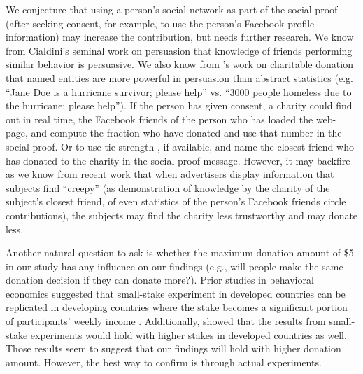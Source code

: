 \begin{description} [leftmargin=\parindent,topsep=0pt,partopsep=3pt,parsep=0pt,itemsep=3pt, listparindent=\parindent]
    We conjecture that using a person's social network as part of the social proof (after seeking consent, for example, to use the person's Facebook profile information) may increase the contribution, but needs further research. We know from Cialdini's seminal work on persuasion that knowledge of friends performing similar behavior is persuasive. We also know from \textcite{small2007sympathy}'s work on charitable donation that named entities are more powerful in persuasion than abstract statistics (e.g. ``Jane Doe is a hurricane survivor; please help'' vs. ``3000 people homeless due to the hurricane; please help''). If the person has given consent, a charity could find out in real time, the Facebook friends of the person who has loaded the web-page, and compute the fraction who have donated and use that number in the social proof. Or to use tie-strength \cite{Gilbert}, if available, and name the closest friend who has donated to the charity in the social proof message. However, it may backfire as we know from recent work \cite{eslami2018communicating} that when advertisers display information that subjects find ``creepy'' (as demonstration of knowledge by the charity of the subject's closest friend, of even statistics of the person's Facebook friends circle contributions), the subjects may find the charity less trustworthy and may donate less.
    
    \item[Donation Amount:] Another natural question to ask is whether the maximum donation amount of  \$5  in our study has any influence on our findings (e.g., will people make the same donation decision if they can donate more?).  Prior studies in behavioral economics suggested that small-stake experiment in developed countries can be replicated in developing countries where the stake becomes a significant portion of participants' weekly income \cite{binswanger1980attitudes,binswanger1981attitudes,kachelmeier1992examining}. Additionally, \textcite{post2008deal} showed that the results from small-stake experiments would hold with higher stakes in developed countries as well. Those results seem to suggest that our findings will hold with higher donation amount. However, the best way to confirm is through actual experiments. 
    

\end{description}

